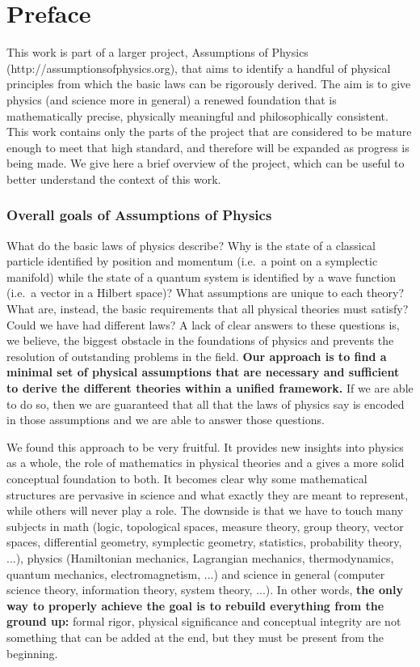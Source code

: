 \documentclass[11pt,letterpaper,fleqn]{memoir} %
\begin{document}
\chapter{Preface}

This work is part of a larger project, Assumptions of Physics (http://assumptionsofphysics.org), that aims to identify a handful of physical principles from which the basic laws can be rigorously derived. The aim is to give physics (and science more in general) a renewed foundation that is mathematically precise, physically meaningful and philosophically consistent. This work contains only the parts of the project that are considered to be mature enough to meet that high standard, and therefore will be expanded as progress is being made. We give here a brief overview of the project, which can be useful to better understand the context of this work.

\subsection{Overall goals of Assumptions of Physics}

What do the basic laws of physics describe? Why is the state of a classical particle identified by position and momentum (i.e.~a point on a symplectic manifold) while the state of a quantum system is identified by a wave function (i.e.~a vector in a Hilbert space)? What assumptions are unique to each theory? What are, instead, the basic requirements that all physical theories must satisfy? Could we have had different laws? A lack of clear answers to these questions is, we believe, the biggest obstacle in the foundations of physics and prevents the resolution of outstanding problems in the field. \textbf{Our approach is to find a minimal set of physical assumptions that are necessary and sufficient to derive the different theories within a unified framework.} If we are able to do so, then we are guaranteed that all that the laws of physics say is encoded in those assumptions and we are able to answer those questions.

We found this approach to be very fruitful. It provides new insights into physics as a whole, the role of mathematics in physical theories and a gives a more solid conceptual foundation to both. It becomes clear why some mathematical structures are pervasive in science and what exactly they are meant to represent, while others will never play a role. The downside is that we have to touch many subjects in math (logic, topological spaces, measure theory, group theory, vector spaces, differential geometry, symplectic geometry, statistics, probability theory, ...), physics (Hamiltonian mechanics, Lagrangian mechanics, thermodynamics, quantum mechanics, electromagnetism, ...) and science in general (computer science theory, information theory, system theory, ...). In other words, \textbf{the only way to properly achieve the goal is to rebuild everything from the ground up:} formal rigor, physical significance and conceptual integrity are not something that can be added at the end, but they must be present from the beginning.
\end{document}
